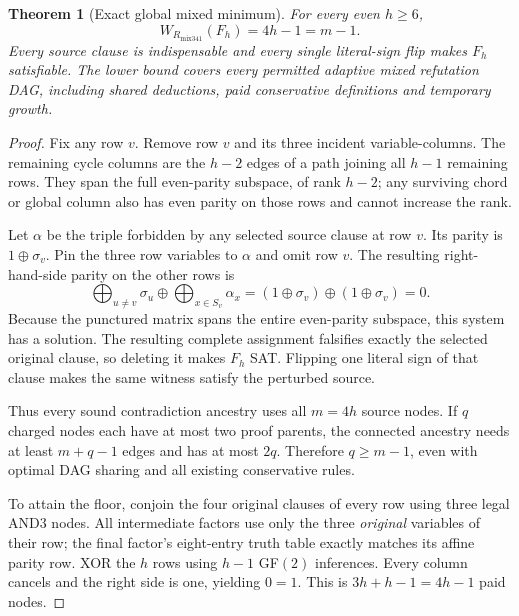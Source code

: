 \documentclass[11pt]{article}
\newtheorem{theorem}{Theorem}
\begin{document}
\begin{theorem}[Exact global mixed minimum]
For every even $h\ge6$,
\[
\boxed{W_{R_{\mathrm{mix341}}}(F_h)=4h-1=m-1}.
\]
Every source clause is indispensable and every single literal-sign flip makes $F_h$ satisfiable. The lower bound covers \emph{every} permitted adaptive mixed refutation DAG, including shared deductions, paid conservative definitions and temporary growth.
\end{theorem}
\begin{proof}
Fix any row $v$. Remove row $v$ and its three incident variable-columns. The remaining cycle columns are the $h-2$ edges of a path joining all $h-1$ remaining rows. They span the full even-parity subspace, of rank $h-2$; any surviving chord or global column also has even parity on those rows and cannot increase the rank.

Let $\alpha$ be the triple forbidden by any selected source clause at row $v$. Its parity is $1\oplus\sigma_v$. Pin the three row variables to $\alpha$ and omit row $v$. The resulting right-hand-side parity on the other rows is
\[
\bigoplus_{u\ne v}\sigma_u \oplus \bigoplus_{x\in S_v}\alpha_x
=(1\oplus\sigma_v)\oplus(1\oplus\sigma_v)=0.
\]
Because the punctured matrix spans the entire even-parity subspace, this system has a solution. The resulting complete assignment falsifies exactly the selected original clause, so deleting it makes $F_h$ SAT. Flipping one literal sign of that clause makes the same witness satisfy the perturbed source.

Thus every sound contradiction ancestry uses all $m=4h$ source nodes. If $q$ charged nodes each have at most two proof parents, the connected ancestry needs at least $m+q-1$ edges and has at most $2q$. Therefore $q\ge m-1$, even with optimal DAG sharing and all existing conservative rules.

To attain the floor, conjoin the four original clauses of every row using three legal AND3 nodes. All intermediate factors use only the three \emph{original} variables of their row; the final factor's eight-entry truth table exactly matches its affine parity row. XOR the $h$ rows using $h-1$ GF$(2)$ inferences. Every column cancels and the right side is one, yielding $0=1$. This is $3h+h-1=4h-1$ paid nodes.
\end{proof}
\end{document}
